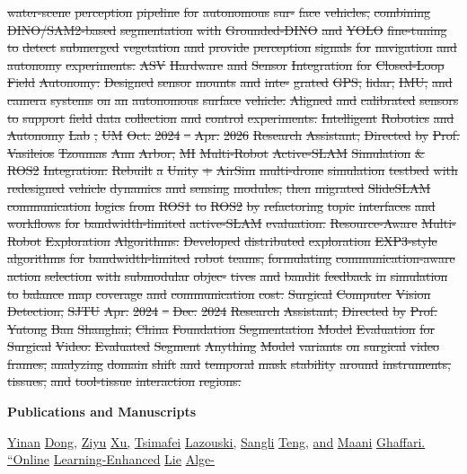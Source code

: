 \documentclass[10pt,letterpaper]{article}
\newcommand{\del}[1]{{\color{red}\sout{#1}}}
\newcommand{\add}[1]{{\color{blue}\uline{#1}}}
\begin{document}
\del{water-scene} \del{perception} \del{pipeline} \del{for} \del{autonomous} \del{sur-} \del{face} \del{vehicles,} \del{combining} \del{DINO/SAM2-based} \del{segmentation} \del{with} \del{Grounded-DINO} \del{and} \del{YOLO} \del{fine-tuning} \del{to} \del{detect} \del{submerged} \del{vegetation} \del{and} \del{provide} \del{perception} \del{signals} \del{for} \del{navigation} \del{and} \del{autonomy} \del{experiments.} \del{} \del{ASV} \del{Hardware} \del{and} \del{Sensor} \del{Integration} \del{for} \del{Closed-Loop} \del{Field} \del{Autonomy:} \del{Designed} \del{sensor} \del{mounts} \del{and} \del{inte-} \del{grated} \del{GPS,} \del{lidar,} \del{IMU,} \del{and} \del{camera} \del{systems} \del{on} \del{an} \del{autonomous} \del{surface} \del{vehicle.} \del{Aligned} \del{and} \del{calibrated} \del{sensors} \del{to} \del{support} \del{field} \del{data} \del{collection} \del{and} \del{control} \del{experiments.} \del{Intelligent} \del{Robotics} \del{and} \del{Autonomy} \del{Lab} \del{,} \del{UM} \del{Oct.} \del{2024} \del{--} \del{Apr.} \del{2026} \del{Research} \del{Assistant,} \del{Directed} \del{by} \del{Prof.} \del{Vasileios} \del{Tzoumas} \del{Ann} \del{Arbor,} \del{MI} \del{} \del{Multi-Robot} \del{Active-SLAM} \del{Simulation} \del{\&} \del{ROS2} \del{Integration:} \del{Rebuilt} \del{a} \del{Unity} \del{+} \del{AirSim} \del{multi-drone} \del{simulation} \del{testbed} \del{with} \del{redesigned} \del{vehicle} \del{dynamics} \del{and} \del{sensing} \del{modules,} \del{then} \del{migrated} \del{SlideSLAM} \del{communication} \del{logics} \del{from} \del{ROS1} \del{to} \del{ROS2} \del{by} \del{refactoring} \del{topic} \del{interfaces} \del{and} \del{workflows} \del{for} \del{bandwidth-limited} \del{active-SLAM} \del{evaluation.} \del{} \del{Resource-Aware} \del{Multi-Robot} \del{Exploration} \del{Algorithms:} \del{Developed} \del{distributed} \del{exploration} \del{EXP3-style} \del{algorithms} \del{for} \del{bandwidth-limited} \del{robot} \del{teams,} \del{formulating} \del{communication-aware} \del{action} \del{selection} \del{with} \del{submodular} \del{objec-} \del{tives} \del{and} \del{bandit} \del{feedback} \del{in} \del{simulation} \del{to} \del{balance} \del{map} \del{coverage} \del{and} \del{communication} \del{cost.} \del{Surgical} \del{Computer} \del{Vision} \del{Detection,} \del{SJTU} \del{Apr.} \del{2024} \del{--} \del{Dec.} \del{2024} \del{Research} \del{Assistant,} \del{Directed} \del{by} \del{Prof.} \del{Yutong} \del{Ban} \del{Shanghai,} \del{China} \del{} \del{Foundation} \del{Segmentation} \del{Model} \del{Evaluation} \del{for} \del{Surgical} \del{Video:} \del{Evaluated} \del{Segment} \del{Anything} \del{Model} \del{variants} \del{on} \del{surgical} \del{video} \del{frames,} \del{analyzing} \del{domain} \del{shift} \del{and} \del{temporal} \del{mask} \del{stability} \del{around} \del{instruments,} \del{tissues,} \del{and} \del{tool-tissue} \del{interaction} \del{regions.} \par\medskip\textbf{Publications and Manuscripts}\par  \add{} \add{Yinan} \add{Dong,} \add{Ziyu} \add{Xu,} \add{Tsimafei} \add{Lazouski,} \add{Sangli} \add{Teng,} \add{and} \add{Maani} \add{Ghaffari.} \add{``Online} \add{Learning-Enhanced} \add{Lie} \add{Alge-} 
\end{document}
